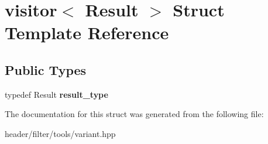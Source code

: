 \hypertarget{structvisitor}{}\section{visitor$<$ Result $>$ Struct Template Reference}
\label{structvisitor}
\subsection*{Public Types}
\begin{DoxyCompactItemize}
\item 
\mbox{\label{structvisitor_aa2fdb564628c5053a3649ad865d7ad7e}} 
typedef Result {\bfseries result\+\_\+type}
\end{DoxyCompactItemize}


The documentation for this struct was generated from the following file\+:\begin{DoxyCompactItemize}
\item 
header/filter/tools/variant.\+hpp\end{DoxyCompactItemize}
